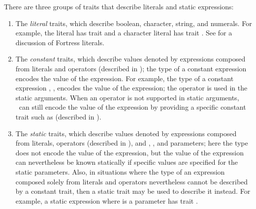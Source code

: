 There are three groups of traits that describe literals
and static expressions:
\begin{enumerate}
\item The \emph{literal} traits, which describe boolean,
  character, string, and numerals.  For example, the literal  has
  trait  and a
  character literal has trait .
See  for a discussion of Fortress literals.

\item The \emph{constant} traits, which describe values denoted by
expressions composed from literals and operators (described in
);
the type of a constant expression encodes the value of the expression.
For example, the type of a constant expression ,
,
encodes the value of the expression; the operator \EXP{+} is
used in the static arguments.  When an operator is not supported in static
arguments, \library\ can still encode the value of the expression by
providing a specific constant trait such as
(described in ).



\item The \emph{static} traits, which describe values denoted by
expressions composed from literals, operators (described in
), and , ,
and  parameters; here the type
does not encode the value of the expression, but the value of the
expression can nevertheless be known statically if specific
values are specified for the static parameters.  Also, in situations
where the type of an expression composed solely from literals and
operators nevertheless cannot be described by a constant trait, then a
static trait may be used to describe it instead.
For example, a static expression  where  is a
 parameter has trait .
\end{enumerate}

